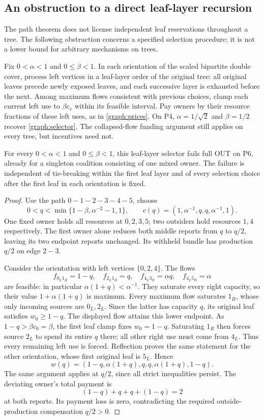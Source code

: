 
\subsection{An obstruction to a direct leaf-layer recursion}
The path theorem does not license independent leaf reservations throughout a
tree. The following obstruction concerns a specified selection procedure;
it is not a lower bound for arbitrary mechanisms on trees.

Fix $0<\alpha<1$ and $0\le\beta<1$. In each orientation of the scaled
bipartite double cover, process left vertices in a leaf-layer order of the
original tree: all original leaves precede newly exposed leaves, and each
successive layer is exhausted before the next. Among maximum flows consistent
with previous choices, clamp each current left use to $\beta c_v$ within its
feasible interval. Pay owners by their resource fractions of these left uses,
as in \eqref{graph:prices}. On P4, $\alpha=1/\sqrt2$ and $\beta=1/2$
recover \eqref{graph:selector}. The collapsed-flow funding argument still
applies on every tree, but incentives need not.

\begin{proposition}\label{graph:recursion-failure}
For every $0<\alpha<1$ and $0\le\beta<1$, this leaf-layer selector fails
full OUT on P6, already for a singleton coalition consisting of one mixed owner.
The failure is independent of tie-breaking within the first leaf layer and
of every selection choice after the first leaf in each orientation is fixed.
\end{proposition}
\begin{proof}
Use the path $0-1-2-3-4-5$, choose
\[
 0<q<\min\{1-\beta,\alpha^{-2}-1,1\},
 \qquad c(q)=(1,\alpha^{-1},q,q,\alpha^{-1},1).
\]
One fixed owner holds all resources at $0,2,3,5$; two outsiders hold resources
$1,4$ respectively. The first owner alone reduces both middle reports from
$q$ to $q/2$, leaving its two endpoint reports unchanged. Its withheld bundle
has production $q/2$ on edge $2-3$.

Consider the orientation with left vertices $\{0,2,4\}$. The flows
\[
 f_{0_L1_R}=1-q,\quad f_{2_L1_R}=q,\quad
 f_{4_L3_R}=\alpha q,\quad f_{4_L5_R}=\alpha
\]
are feasible: in particular $\alpha(1+q)<\alpha^{-1}$.
They saturate every right capacity, so their value $1+\alpha(1+q)$ is
maximum. Every maximum flow saturates $1_R$, whose only incoming sources
are $0_L,2_L$. Since the latter has capacity $q$, its original leaf satisfies
$w_0\ge1-q$. The displayed flow attains this lower endpoint. As
$1-q>\beta c_0=\beta$, the first leaf clamp fixes $w_0=1-q$.
Saturating $1_R$ then forces source $2_L$ to spend its entire $q$ there;
all other right use must come from $4_L$. Thus every remaining left use
is forced. Reflection proves the same statement for the other orientation,
whose first original leaf is $5_L$. Hence
\[
 w(q)=(1-q,\alpha(1+q),q,q,\alpha(1+q),1-q).
\]
The same argument applies at $q/2$, since all strict inequalities persist.
The deviating owner's total payment is
\[
 (1-q)+q+q+(1-q)=2
\]
at both reports. Its payment loss is zero, contradicting the required
outside-production compensation $q/2>0$.
\end{proof}

